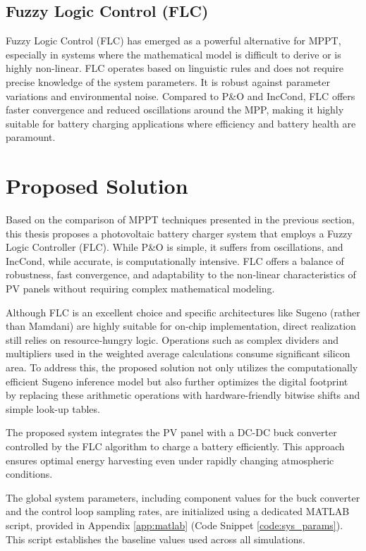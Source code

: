 \documentclass[a4paper,oneside,12pt]{report}
\numberwithin{equation}{chapter}
\begin{document}
\subsection{Fuzzy Logic Control (FLC)}
Fuzzy Logic Control (FLC) has emerged as a powerful alternative for MPPT, especially in systems where the mathematical model is difficult to derive or is highly non-linear. FLC operates based on linguistic rules and does not require precise knowledge of the system parameters. It is robust against parameter variations and environmental noise. Compared to P\&O and IncCond, FLC offers faster convergence and reduced oscillations around the MPP, making it highly suitable for battery charging applications where efficiency and battery health are paramount.

\section{Proposed Solution}
\label{sec:intro_proposed_system}
Based on the comparison of MPPT techniques presented in the previous section, this thesis proposes a photovoltaic battery charger system that employs a Fuzzy Logic Controller (FLC). While P\&O is simple, it suffers from oscillations, and IncCond, while accurate, is computationally intensive. FLC offers a balance of robustness, fast convergence, and adaptability to the non-linear characteristics of PV panels without requiring complex mathematical modeling.

Although FLC is an excellent choice and specific architectures like Sugeno (rather than Mamdani) are highly suitable for on-chip implementation, direct realization still relies on resource-hungry logic. Operations such as complex dividers and multipliers used in the weighted average calculations consume significant silicon area. To address this, the proposed solution not only utilizes the computationally efficient Sugeno inference model but also further optimizes the digital footprint by replacing these arithmetic operations with hardware-friendly bitwise shifts and simple look-up tables.

The proposed system integrates the PV panel with a DC-DC buck converter controlled by the FLC algorithm to charge a battery efficiently. This approach ensures optimal energy harvesting even under rapidly changing atmospheric conditions.

The global system parameters, including component values for the buck converter and the control loop sampling rates, are initialized using a dedicated MATLAB script, provided in Appendix \ref{app:matlab} (Code Snippet \ref{code:sys_params}). This script establishes the baseline values used across all simulations.
\end{document}
